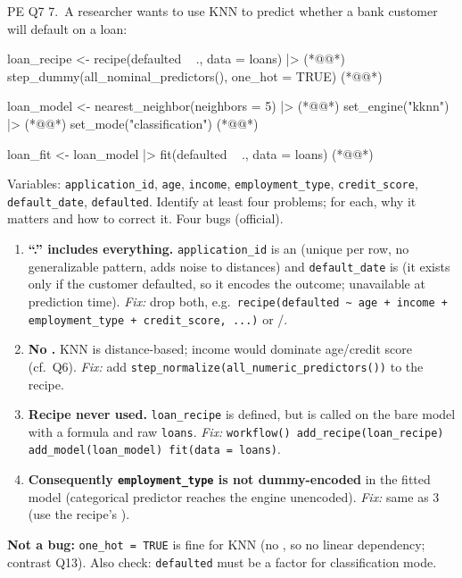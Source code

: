 \begin{qbox}{PE Q7}
7.~A researcher wants to use KNN to predict whether a bank customer will default on a loan:
\begin{rcode}
loan_recipe <-
  recipe(defaulted ~ ., data = loans) |>                    (*@\ixch{|>}@*)
  step_dummy(all_nominal_predictors(), one_hot = TRUE)      (*@@*)

loan_model <-
  nearest_neighbor(neighbors = 5) |>                        (*@@*)
  set_engine("kknn") |>                                     (*@@*)
  set_mode("classification")                                (*@@*)

loan_fit <-
  loan_model |>
  fit(defaulted ~ ., data = loans)                          (*@@*)
\end{rcode}
Variables: \texttt{application\_id}, \texttt{age}, \texttt{income}, \texttt{employment\_type}, \texttt{credit\_score}, \texttt{default\_date}, \texttt{defaulted}. Identify at least four problems; for each, why it matters and how to correct it.
\ans Four bugs (official).
\begin{enumerate}[leftmargin=1.4em,itemsep=0pt]
\item \textbf{``.'' includes everything.} \texttt{application\_id} is an  (unique per row, no generalizable pattern, adds noise to distances) and \texttt{default\_date} is  (it exists only if the customer defaulted, so it encodes the outcome; unavailable at prediction time). \emph{Fix:} drop both, e.g.\ \texttt{recipe(defaulted \textasciitilde{} age + income + employment\_type + credit\_score, ...)} or /.
\item \textbf{No .} KNN is distance-based; income would dominate age/credit score (cf.\ Q6). \emph{Fix:} add \texttt{step\_normalize(all\_numeric\_predictors())} to the recipe.
\item \textbf{Recipe never used.} \texttt{loan\_recipe} is defined, but  is called on the bare model with a formula and raw \texttt{loans}. \emph{Fix:} \texttt{workflow() \pipe{} add\_recipe(loan\_recipe) \pipe{} add\_model(loan\_model) \pipe{} fit(data = loans)}.
\item \textbf{Consequently \texttt{employment\_type} is not dummy-encoded} in the fitted model (categorical predictor reaches the engine unencoded). \emph{Fix:} same as 3 (use the recipe's ).
\end{enumerate}
\textbf{Not a bug:} \texttt{one\_hot = TRUE} is fine for KNN (no , so no linear dependency; contrast Q13). Also check: \texttt{defaulted} must be a factor for classification mode. 
\end{qbox}

